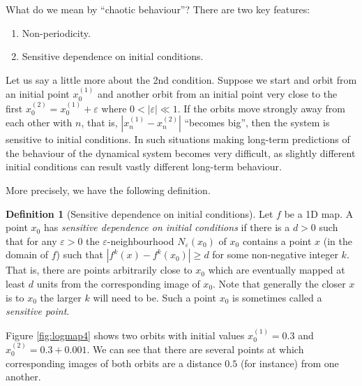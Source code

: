 \documentclass[
  a4paper,
  oneside,
  final]{krantz}
\providecommand{\tightlist}{%
  \setlength{\itemsep}{0pt}\setlength{\parskip}{0pt}}
\renewcommand{\epsilon}{\varepsilon}
\theoremstyle{definition}
\newtheorem{definition}{Definition}[chapter]
\theoremstyle{definition}
\theoremstyle{definition}
\theoremstyle{definition}
\theoremstyle{remark}
\begin{document}
What do we mean by ``chaotic behaviour''? There are two key features:

\begin{enumerate}
\def\labelenumi{\arabic{enumi}.}
\tightlist
\item
  Non-periodicity.
\item
  Sensitive dependence on initial conditions.
\end{enumerate}

Let us say a little more about the 2nd condition. Suppose we start and orbit from an initial point \(x_0^{(1)}\) and another orbit from an initial point very close to the first \(x_0^{(2)} = x_0^{(1)} + \epsilon\) where \(0< |\epsilon| \ll 1\). If the orbits move strongly away from each other with \(n\), that is, \(|x_n^{(1)} - x_{n}^{(2)}|\) ``becomes big'', then the system is sensitive to initial conditions. In such situations making long-term predictions of the behaviour of the dynamical system becomes very difficult, as slightly different initial conditions can result vastly different long-term behaviour.

More precisely, we have the following definition.

\begin{definition}[Sensitive dependence on initial conditions]
\protect\hypertarget{def:sensitivity-to-intial}{}\label{def:sensitivity-to-intial}Let \(f\) be a 1D map. A point \(x_0\) has \emph{sensitive dependence on initial conditions} if there is a \(d>0\) such that for any \(\epsilon >0\) the \(\epsilon\)-neighbourhood \(N_{\epsilon}(x_0)\) of \(x_0\) contains a point \(x\) (in the domain of \(f\)) such that \(|f^k(x) -f^{k}(x_0)| \ge d\) for some non-negative integer \(k\). That is, there are points arbitrarily close to \(x_0\) which are eventually mapped at least \(d\) units from the corresponding image of \(x_0\). Note that generally the closer \(x\) is to \(x_0\) the larger \(k\) will need to be. Such a point \(x_0\) is sometimes called a \emph{sensitive point}.
\end{definition}

Figure \ref{fig:logmap4} shows two orbits with initial values \(x_0^{(1)} = 0.3\) and \(x_0^{(2)} = 0.3 + 0.001\). We can see that there are several points at which corresponding images of both orbits are a distance \(0.5\) (for instance) from one another.
\end{document}

